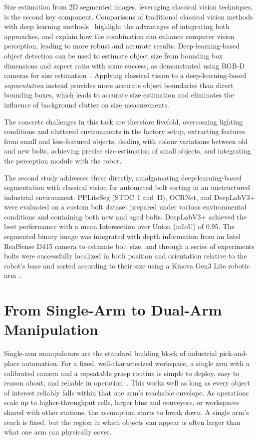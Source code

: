 Size estimation from 2D segmented images, leveraging classical vision techniques, is the second key
component. Comparisons of traditional classical vision methods with deep learning
methods~\citep{omahony2020deep} highlight the advantages of integrating both approaches, and
explain how the combination can enhance computer vision perception, leading to more robust and
accurate results. Deep-learning-based object detection can be used to estimate object size from
bounding box dimensions and aspect ratio with some success, as demonstrated using RGB-D cameras for
size estimation~\citep{wang2017tree}. Applying classical vision to a deep-learning-based
\emph{segmentation} instead provides more accurate object boundaries than direct bounding boxes,
which leads to accurate size estimation and eliminates the influence of background clutter on size
measurements.

The concrete challenges in this task are therefore fivefold, overcoming lighting conditions and
cluttered environments in the factory setup, extracting features from small and less-featured
objects, dealing with colour variations between old and new bolts, achieving precise size
estimation of small objects, and integrating the perception module with the
robot.

The second study addresses these directly, amalgamating deep-learning-based segmentation with
classical vision for automated bolt sorting in an unstructured industrial environment. PPLiteSeg
(STDC~I and~II), OCRNet, and DeepLabV3+ were evaluated on a custom bolt dataset prepared under
various environmental conditions and containing both new and aged bolts. DeepLabV3+ achieved the
best performance with a mean Intersection over Union (mIoU) of 0.95. The segmented binary image was
integrated with depth information from an Intel RealSense D415 camera to estimate bolt size, and
through a series of experiments bolts were successfully localized in both position and orientation
relative to the robot's base and sorted according to their size using a Kinova Gen3 Lite robotic
arm~\citep{sk2024boltsorting}.

\section{From Single-Arm to Dual-Arm Manipulation}\label{sec:intro_dualarm}

Single-arm manipulators are the standard building block of industrial pick-and-place automation.
For a fixed, well-characterized workspace, a single arm with a calibrated camera and a repeatable
grasp routine is simple to deploy, easy to reason about, and reliable in
operation~\citep{sk2024boltsorting, corke1996visual, 6920015}. This works well as long as every object of interest reliably falls within that one arm's reachable envelope. As operations scale up to higher-throughput cells, larger bins and conveyors, or workspaces shared with other stations, the
assumption starts to break down. A single arm's reach is fixed, but the region in which objects can
appear is often larger than what one arm can physically cover.

